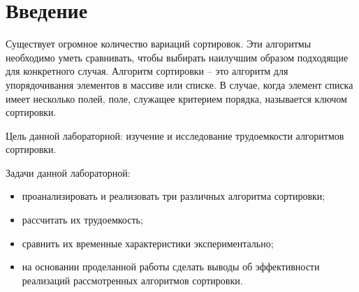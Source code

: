 \chapter*{Введение}

Существует огромное количество вариаций сортировок. Эти алгоритмы необходимо
уметь сравнивать, чтобы выбирать наилучшим образом подходящие для конкретного случая. Алгоритм сортировки -- это алгоритм для упорядочивания элементов в массиве или списке. В случае, когда
элемент списка имеет несколько полей, поле, служащее критерием порядка, называется
ключом сортировки. 

Цель данной лабораторной: изучение и исследование трудоемкости алгоритмов сортировки. %

Задачи данной лабораторной:

\begin{itemize}
	\item проанализировать и реализовать три различных алгоритма сортировки;
	\item рассчитать их трудоемкость;
	\item сравнить их временные характеристики экспериментально;
	\item на основании проделанной работы сделать выводы об эффективности реализаций рассмотренных алгоритмов сортировки.
\end{itemize}
